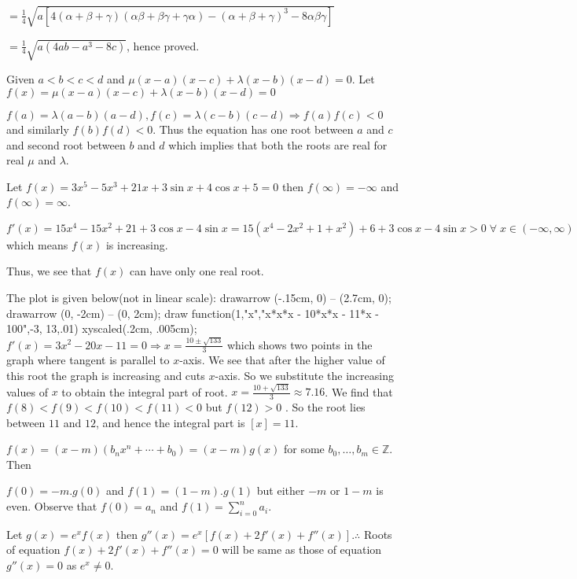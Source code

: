   $= \frac{1}{4}\sqrt{a[4(\alpha + \beta + \gamma)(\alpha\beta + \beta\gamma + \gamma\alpha) - (\alpha +
      \beta + \gamma)^3 - 8\alpha\beta\gamma]}$

  $= \frac{1}{4}\sqrt{a(4ab - a^3 - 8c)}$, hence proved.
\item Given $a < b < c < d$ and $\mu(x - a)(x - c) + \lambda(x - b)(x - d) = 0$. Let $f(x) = \mu(x - a)(x -
  c) + \lambda(x - b)(x - d) = 0$

  $f(a) = \lambda(a - b)(a - d), f(c) = \lambda(c - b)(c - d)\Rightarrow f(a)f(c) < 0$ and similarly
  $f(b)f(d) < 0$. Thus the equation has one root between $a$ and $c$ and second root between $b$ and $d$
  which implies that both the roots are real for real $\mu$ and $\lambda$.
\item Let $f(x) = 3x^5 - 5x^3 + 21x + 3\sin x + 4\cos x + 5 = 0$ then $f(\infty) = -\infty$ and $f(\infty) =
  \infty$.

  $f'(x) = 15x^4 - 15x^2 + 21 + 3\cos x - 4\sin x = 15(x^4 - 2x^2 + 1 + x^2) + 6 + 3\cos x - 4\sin x >
  0\;\forall\;x\in(-\infty, \infty)$ which means $f(x)$ is increasing.

  Thus, we see that $f(x)$ can have only one real root.
\item The plot is given below(not in linear scale):
  \startplacefigure[location={left,none}]
    \startMPcode
      drawarrow (-.15cm, 0) -- (2.7cm, 0);
      drawarrow (0, -2cm) -- (0, 2cm);
      draw function(1,"x","x*x*x - 10*x*x - 11*x - 100",-3, 13,.01) xyscaled(.2cm, .005cm);
    \stopMPcode
  \stopplacefigure
  $f'(x) = 3x^2 - 20x - 11 = 0 \Rightarrow x = \frac{10\pm\sqrt{133}}{3}$ which shows two points in the
  graph where tangent is parallel to $x$-axis. We see that after the higher value of this root the graph is
  increasing and cuts $x$-axis. So we substitute the increasing values of $x$ to obtain the integral part of
  root. $x = \frac{10 + \sqrt{133}}{3}\approx 7.16$. We find that $f(8) < f(9) < f(10) < f(11) < 0$ but
  $f(12) > 0$ . So the root lies between $11$ and $12$, and hence the integral part is $[x] = 11$.
  \vskip 0.9cm
\item $f(x)=(x-m)(b_n x^n+\cdots + b_0)=(x-m)g(x)$ for some $b_0, \ldots, b_m\in\mathbb{Z}$. Then

  $f(0) = -m.g(0)$ and $f(1) = (1 - m).g(1)$ but either $-m$ or $1 - m$ is even. Observe that $f(0) = a_n$
  and $f(1) = \displaystyle\sum_{i=0}^na_i$.
\item Let $g(x) = e^xf(x)$ then $g''(x) = e^x[f(x) + 2f'(x) + f''(x)]. \therefore$ Roots of equation $f(x) +
  2f'(x) + f''(x) = 0$ will be same as those of equation $g''(x) = 0$ as $e^x\neq 0$.

